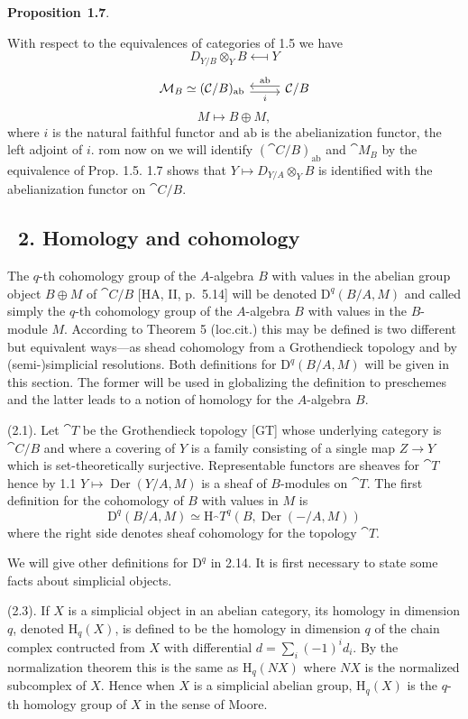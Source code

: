 \documentclass[10pt,reqno]{amsart}
\DeclareMathOperator{\Der}{Der}
\newenvironment{prop}[1]{
\par\medskip\noindent\textbf{Proposition}~\textbf{#1}.\,\itshape
}
\newcommand{\cat}{\mathcal}
\newcommand{\C}{\cat{C}}
\newcommand{\M}{\cat{M}}
\newcommand{\T}{\cat{T}}
\renewcommand{\H}{\mathrm{H}}
\newcommand{\D}{\mathrm{D}}
\begin{document}
\begin{prop}{1.7}
With respect to the equivalences of categories of 1.5 we have
\[
  D_{Y/B}\otimes_Y B\longmapsfrom Y
\]
\[
  \begin{tikzcd}
  {\M_B\simeq(\C/B)_\text{ab}}\ar[r,"i"',shift right]
  & {\C/B}\ar[l,"\text{ab}"',shift right]
  \end{tikzcd}
\]
\[
  M\longmapsto B\oplus M,
\]
where $i$ is the natural faithful functor and $\text{ab}$ is the abelianization functor,
the left adjoint of $i$.
\end{prop}

From now on we will identify $(\C/B)_\text{ab}$ and $\M_B$ by the equivalence of
Prop. 1.5. 1.7 shows that $Y\mapsto D_{Y/A}\otimes_Y B$ is identified with the
abelianization functor on $\C/B$.

\subsection*{\textsection~2. Homology and cohomology}

The $q$-th cohomology group of the $A$-algebra $B$ with values in the abelian group
object $B\oplus M$ of $\C/B$ [HA, II, p.~5.14] will be denoted
$\D^q(B/A,M)$ and called simply the $q$-th cohomology group of the $A$-algebra $B$
with values in the $B$-module $M$. According to Theorem 5 (loc.cit.) this may be
defined is two different but equivalent ways---as shead cohomology from a
Grothendieck topology and by (semi-)simplicial resolutions. Both definitions for
$\D^q(B/A,M)$ will be given in this section. The former will be used in globalizing
the definition to preschemes and the latter leads to a notion of homology for the
$A$-algebra $B$.

(2.1). Let $\T$ be the Grothendieck topology [GT] whose underlying
category is $\C/B$ and where a covering of $Y$ is a family consisting of a single map
$Z\to Y$ which is set-theoretically surjective. Representable functors are sheaves for
$\T$ hence by 1.1 $Y\mapsto\Der(Y/A,M)$ is a sheaf of $B$-modules on $\T$.
The first definition for the cohomology of $B$ with values in $M$ is
\[
  \D^q(B/A,M)\simeq\H_\T^q(B,\Der(-/A,M))\tag{2.2}
\]
where the right side denotes sheaf cohomology for the topology $\T$.

We will give other definitions for $\D^q$ in 2.14. It is first necessary to state some
facts about simplicial objects.

(2.3). If $X$ is a simplicial object in an abelian category, its homology in
dimension $q$, denoted $\H_q(X)$, is defined to be the homology in dimension $q$ of
the chain complex contructed from $X$ with differential $d=\sum_i(-1)^i d_i$. By the
normalization theorem this is the same as $\H_q(NX)$ where $NX$ is the normalized
subcomplex of $X$. Hence when $X$ is a simplicial abelian group, $\H_q(X)$ is the
$q$-th homology group of $X$ in the sense of Moore.
\end{document}
